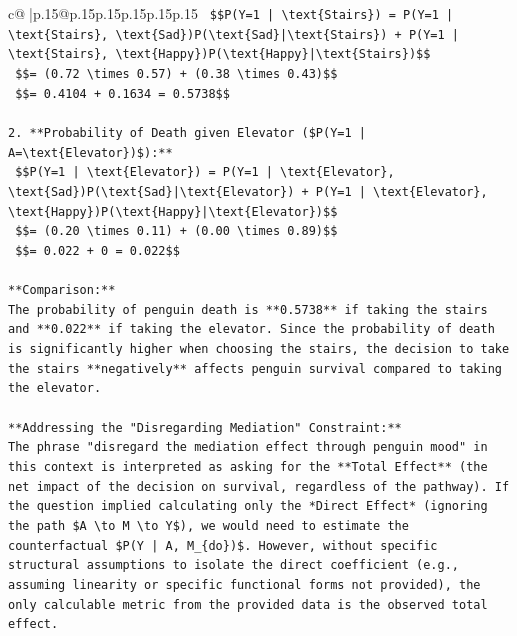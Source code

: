 \documentclass{article}
\begin{document}
{\begin{supertabular}{c@{$\;$}|p{.15\linewidth}@{}p{.15\linewidth}p{.15\linewidth}p{.15\linewidth}p{.15\linewidth}p{.15\linewidth}}
{{{\texttt{    \$\$P(Y=1 | \textbackslash{}text\{Stairs\}) = P(Y=1 | \textbackslash{}text\{Stairs\}, \textbackslash{}text\{Sad\})P(\textbackslash{}text\{Sad\}|\textbackslash{}text\{Stairs\}) + P(Y=1 | \textbackslash{}text\{Stairs\}, \textbackslash{}text\{Happy\})P(\textbackslash{}text\{Happy\}|\textbackslash{}text\{Stairs\})\$\$} \\
\texttt{    \$\$= (0.72 \textbackslash{}times 0.57) + (0.38 \textbackslash{}times 0.43)\$\$} \\
\texttt{    \$\$= 0.4104 + 0.1634 = 0.5738\$\$} \\
\\ 
\texttt{2.  **Probability of Death given Elevator (\$P(Y=1 | A=\textbackslash{}text\{Elevator\})\$):**} \\
\texttt{    \$\$P(Y=1 | \textbackslash{}text\{Elevator\}) = P(Y=1 | \textbackslash{}text\{Elevator\}, \textbackslash{}text\{Sad\})P(\textbackslash{}text\{Sad\}|\textbackslash{}text\{Elevator\}) + P(Y=1 | \textbackslash{}text\{Elevator\}, \textbackslash{}text\{Happy\})P(\textbackslash{}text\{Happy\}|\textbackslash{}text\{Elevator\})\$\$} \\
\texttt{    \$\$= (0.20 \textbackslash{}times 0.11) + (0.00 \textbackslash{}times 0.89)\$\$} \\
\texttt{    \$\$= 0.022 + 0 = 0.022\$\$} \\
\\ 
\texttt{**Comparison:**} \\
\texttt{The probability of penguin death is **0.5738** if taking the stairs and **0.022** if taking the elevator. Since the probability of death is significantly higher when choosing the stairs, the decision to take the stairs **negatively** affects penguin survival compared to taking the elevator.} \\
\\ 
\texttt{**Addressing the "Disregarding Mediation" Constraint:**} \\
\texttt{The phrase "disregard the mediation effect through penguin mood" in this context is interpreted as asking for the **Total Effect** (the net impact of the decision on survival, regardless of the pathway). If the question implied calculating only the *Direct Effect* (ignoring the path \$A \textbackslash{}to M \textbackslash{}to Y\$), we would need to estimate the counterfactual \$P(Y | A, M\_\{do\})\$. However, without specific structural assumptions to isolate the direct coefficient (e.g., assuming linearity or specific functional forms not provided), the only calculable metric from the provided data is the observed total effect.} \\
}}}
\end{supertabular}}
\end{document}
